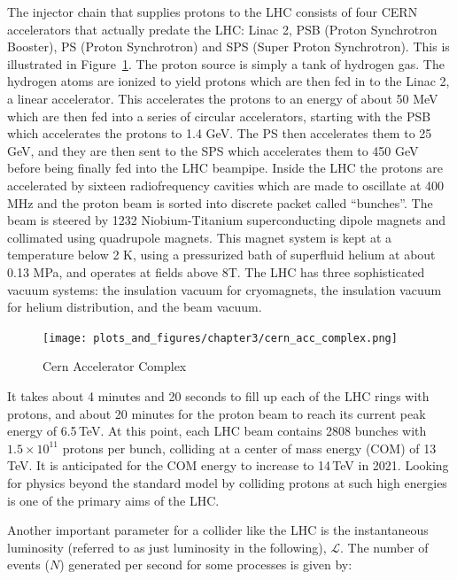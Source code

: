The injector chain that supplies protons to the LHC consists of four CERN accelerators that actually predate the LHC: Linac 2, PSB (Proton Synchrotron Booster), PS (Proton Synchrotron) and SPS (Super Proton Synchrotron). This is illustrated in Figure~\ref{fig:cern_acc_comp}. The proton source is simply a tank of hydrogen gas. The hydrogen atoms are ionized to yield protons which are then fed in to the Linac 2, a linear accelerator. This accelerates the protons to an energy of about 50 MeV which are then fed into a series of circular accelerators, starting with the PSB which accelerates the protons to 1.4 GeV. The PS then accelerates them to 25 GeV, and they are then sent to the SPS which accelerates them to 450 GeV before being finally fed into the LHC beampipe. Inside the LHC the protons are accelerated by sixteen radiofrequency cavities which are made to oscillate at 400 MHz and the proton beam is sorted into discrete packet called ``bunches''. The beam is steered by 1232 Niobium-Titanium superconducting dipole magnets and collimated using quadrupole magnets. This magnet system is kept at a temperature below 2 K, using a pressurized bath of superfluid helium at about 0.13 MPa, and operates at fields above 8T. The LHC has three sophisticated vacuum systems: the insulation vacuum for cryomagnets, the insulation vacuum for helium distribution, and the beam vacuum.

\begin{figure}
\begin{center}
\captionsetup{justification=centering}
\texttt{[image: plots\_and\_figures/chapter3/cern\_acc\_complex.png]}
\caption{Cern Accelerator Complex ~\cite{acc_complex}}
\label{fig:cern_acc_comp}
\end{center}
\end{figure}


It takes about 4 minutes and 20 seconds to fill up each of the LHC rings with protons, and about 20 minutes for the proton beam to reach its current peak energy of 6.5\,TeV. At this point, each LHC beam contains 2808 bunches with $1.5 \times 10^{11}$ protons per bunch, colliding at a center of mass energy (COM) of 13 TeV. It is anticipated for the COM energy to increase to 14\,TeV in 2021. Looking for physics beyond the standard model by colliding protons at such high energies is one of the primary aims of the LHC.

Another important parameter for a collider like the LHC is the instantaneous luminosity (referred to as just luminosity in the following), $\mathscr{L}$. The number of events ($N$) generated per second for some processes is given by:

